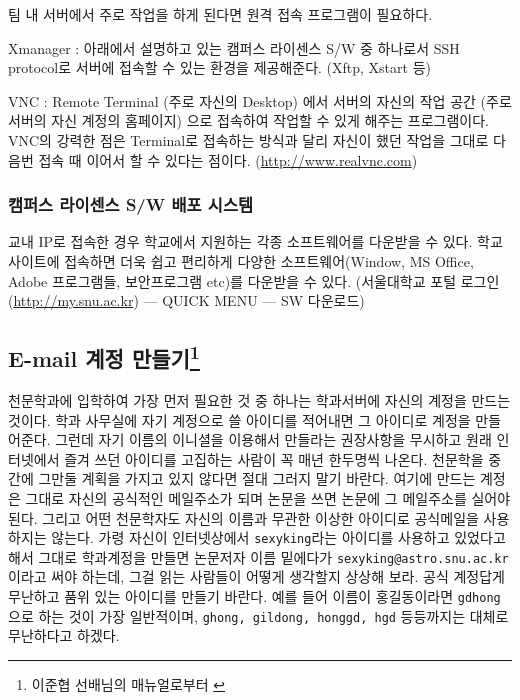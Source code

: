 팀 내 서버에서 주로 작업을 하게 된다면 원격 접속 프로그램이 필요하다.
\begin{packed_item}
\item Xmanager : 아래에서 설명하고 있는 캠퍼스 라이센스 S/W 중 하나로서 SSH protocol로 서버에 접속할 수 있는 환경을 제공해준다. (Xftp, Xstart 등)
\item VNC :  Remote Terminal (주로 자신의 Desktop) 에서 서버의 자신의 작업 공간 (주로 서버의 자신 계정의 홈페이지) 으로 접속하여 작업할 수 있게 해주는 프로그램이다.  VNC의 강력한 점은 Terminal로 접속하는 방식과 달리 자신이 했던 작업을 그대로 다음번 접속 때 이어서 할 수 있다는 점이다. (\url{http://www.realvnc.com})
\end{packed_item}

\subsubsection{캠퍼스 라이센스 S/W 배포 시스템}
교내 IP로 접속한 경우 학교에서 지원하는 각종 소프트웨어를 다운받을 수 있다. 학교 사이트에 접속하면 더욱 쉽고 편리하게 다양한 소프트웨어(Window, MS Office, Adobe 프로그램들, 보안프로그램 etc)를 다운받을 수 있다. (서울대학교 포털 로그인(\url{http://my.snu.ac.kr}) --- QUICK MENU --- SW 다운로드)

\subsection[E-mail 계정 만들기]{E-mail 계정 만들기\footnote{이준협 선배님의 매뉴얼로부터 \cite{manual_ljh}}}
천문학과에 입학하여 가장 먼저 필요한 것 중 하나는 학과서버에 자신의 계정을 만드는 것이다. 학과 사무실에 자기 계정으로 쓸 아이디를 적어내면 그 아이디로 계정을 만들어준다. 그런데 자기 이름의 이니셜을 이용해서 만들라는 권장사항을 무시하고 원래 인터넷에서 즐겨 쓰던 아이디를 고집하는 사람이 꼭 매년 한두명씩 나온다. 천문학을 중간에 그만둘 계획을 가지고 있지 않다면 절대 그러지 말기 바란다. 여기에 만드는 계정은 그대로 자신의 공식적인 메일주소가 되며 논문을 쓰면 논문에 그 메일주소를 실어야 된다. 그리고 어떤 천문학자도 자신의 이름과 무관한 이상한 아이디로 공식메일을 사용하지는 않는다. 가령 자신이 인터넷상에서 \texttt{sexyking}라는 아이디를 사용하고 있었다고 해서 그대로 학과계정을 만들면 논문저자 이름 밑에다가 \texttt{sexyking@astro.snu.ac.kr} 이라고 써야 하는데, 그걸 읽는 사람들이 어떻게 생각할지 상상해 보라. 공식 계정답게 무난하고 품위 있는 아이디를 만들기 바란다. 예를 들어 이름이 홍길동이라면 \texttt{gdhong} 으로 하는 것이 가장 일반적이며, \texttt{ghong, gildong, honggd, hgd} 등등까지는 대체로 무난하다고 하겠다.

